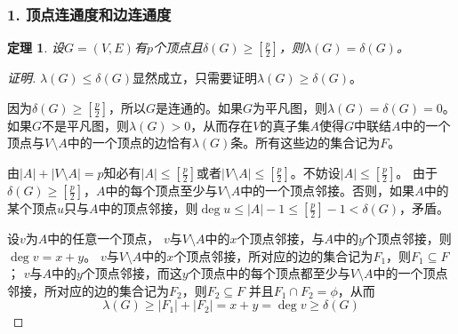 \documentclass{beamer}
\newtheorem{Thm}{定理}[section]
\theoremstyle{definition}
\theoremstyle{example}
\begin{document}
\begin{CJK}{UTF8}{gbsn}
\begin{frame}
\begin{center}
\end{center}

  \end{frame}
  \begin{frame}
  \frametitle{1. 顶点连通度和边连通度}

  \begin{Thm}
    设$G=(V,E)$有$p$个顶点且$\delta(G) \geq [ \frac{p}{2} ]$，则$\lambda(G) = \delta(G)$。
  \end{Thm}\small{\pause
  \begin{proof}[证明]\justifying\let\raggedright\justifying
    \pause $\lambda(G) \leq \delta(G)$显然成立，\pause 只需要证明$\lambda(G) \geq \delta(G)$。

     

   \pause 因为$\delta(G) \geq [\frac{p}{2}]$，所以$G$是连通的。\pause 如果$G$为平凡图，则$\lambda (G) = \delta(G) = 0$。如果$G$不是平凡图，则$\lambda(G) > 0$，从而存在$V$的真子集$A$使得$G$中联结$A$中的一个顶点与$V\setminus A$中的一个顶点的边恰有$\lambda(G)$条。\pause 所有这些边的集合记为$F$。

  \pause  由$|A| + |V\setminus A| = p$知必有$|A| \leq [\frac{p}{2}]$或者$|V\setminus A| \leq [\frac{p}{2}]$。\pause 不妨设$|A| \leq [\frac{p}{2}]$。 \pause 由于$\delta(G) \geq [\frac{p}{2}]$，$A$中的每个顶点至少与$V\setminus A$中的一个顶点邻接。\pause 否则，如果$A$中的某个顶点$u$只与$A$中的顶点邻接，则$\deg u \leq |A|-1 \leq [\frac{p}{2}] - 1 < \delta(G)$，矛盾。 

\pause    设$v$为$A$中的任意一个顶点， $v$与$V\setminus A$中的$x$个顶点邻接，与$A$中的$y$个顶点邻接，则$\deg v = x + y$。 \pause $v$与$V\setminus A$中的$x$个顶点邻接，所对应的边的集合记为$F_1$，则$F_1 \subseteq F$；
 \pause    $v$与$A$中的$y$个顶点邻接，而这$y$个顶点中的每个顶点都至少与$V\setminus A$中的一个顶点邻接，所对应的边的集合记为$F_2$，则$F_2 \subseteq F$ 并且$F_1 \cap F_2 = \phi$，\pause 从而
    \[\lambda(G) \geq |F_1| + |F_2| = x + y = \deg v \geq  \delta(G)\]
  \end{proof}}
\end{frame}



\end{CJK}
\end{document}
